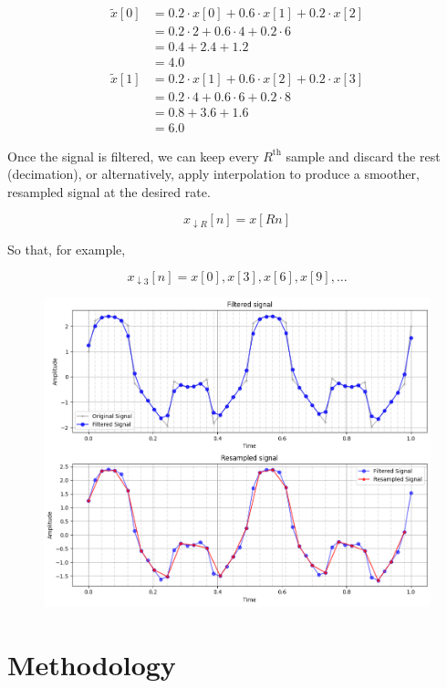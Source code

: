 \documentclass[conference]{IEEEtran}
\begin{document}
\begin{align*}
	\tilde{x}[0]	&= 0.2 \cdot x[0] + 0.6 \cdot x[1] + 0.2 \cdot x[2] \\
					&= 0.2\cdot2 + 0.6\cdot4 + 0.2\cdot6 \\
					&= 0.4 + 2.4 + 1.2 \\
					&= 4.0\\
	\tilde{x}[1] 	&= 0.2 \cdot x[1] + 0.6 \cdot x[2] + 0.2 \cdot x[3] \\
					&= 0.2\cdot4 + 0.6\cdot6 + 0.2\cdot8 \\
					&= 0.8 + 3.6 + 1.6 \\
					&= 6.0
\end{align*}

Once the signal is filtered, we can keep every $R^\text{th}$ sample and discard the rest (decimation), or alternatively, apply interpolation to produce a smoother, resampled signal at the desired rate.

$$x_{\downarrow R}[n] = x[Rn]$$

So that, for example,

$$x_{\downarrow 3}[n] = x[0], x[3], x[6], x[9], \dots$$







\begin{figure}[H]
	\centering
	\includegraphics[width=0.9\linewidth]{img/img-resampling}
	\caption{}
	\label{fig:img-resampling}
\end{figure}




\section{Methodology}
\end{document}
